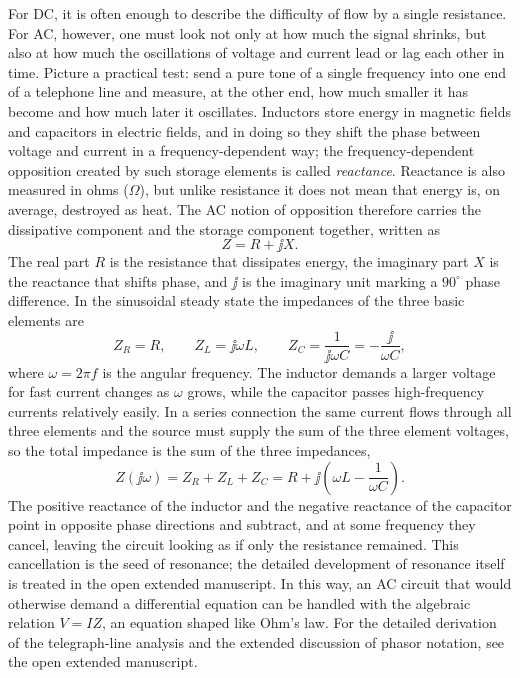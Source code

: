 For DC, it is often enough to describe the difficulty of flow by a single
resistance.
For AC, however, one must look not only at how much the signal shrinks, but
also at how much the oscillations of voltage and current lead or lag each
other in time.
Picture a practical test: send a pure tone of a single frequency into one
end of a telephone line and measure, at the other end, how much smaller it
has become and how much later it oscillates.
Inductors store energy in magnetic fields and capacitors in electric
fields, and in doing so they shift the phase between voltage and current in
a frequency-dependent way; the frequency-dependent opposition created by
such storage elements is called \emph{reactance}.
Reactance is also measured in ohms ($\Omega$), but unlike resistance it does
not mean that energy is, on average, destroyed as heat.
The AC notion of opposition therefore carries the dissipative component and
the storage component together, written as
\begin{equation}
  Z = R + \jj X.
\end{equation}
The real part $R$ is the resistance that dissipates energy, the imaginary
part $X$ is the reactance that shifts phase, and $\jj$ is the imaginary unit
marking a $90^\circ$ phase difference.
In the sinusoidal steady state the impedances of the three basic elements
are
\begin{equation}
  Z_R = R, \qquad
  Z_L = \jj\omega L, \qquad
  Z_C = \frac{1}{\jj\omega C} = -\frac{\jj}{\omega C},
\end{equation}
where $\omega=2\pi f$ is the angular frequency.
The inductor demands a larger voltage for fast current changes as $\omega$
grows, while the capacitor passes high-frequency currents relatively
easily.
In a series connection the same current flows through all three elements
and the source must supply the sum of the three element voltages, so the
total impedance is the sum of the three impedances,
\begin{equation}
  Z(\jj\omega) = Z_R + Z_L + Z_C
  = R + \jj\left(\omega L - \frac{1}{\omega C}\right).
\end{equation}
The positive reactance of the inductor and the negative reactance of the
capacitor point in opposite phase directions and subtract, and at some
frequency they cancel, leaving the circuit looking as if only the
resistance remained.
This cancellation is the seed of resonance; the detailed development of
resonance itself is treated in the open extended manuscript.
In this way, an AC circuit that would otherwise demand a differential
equation can be handled with the algebraic relation $V=IZ$, an equation
shaped like Ohm's law.
For the detailed derivation of the telegraph-line analysis and the extended
discussion of phasor notation, see the open extended manuscript.

